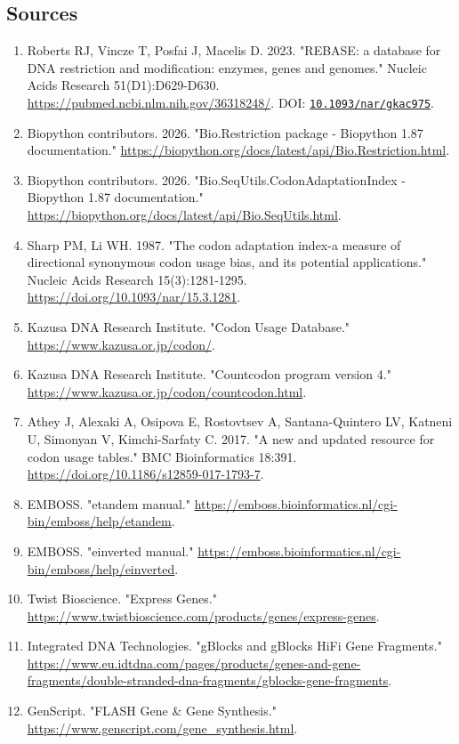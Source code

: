 \documentclass[11pt]{report}
\begin{document}
\subsection{Sources}
\begin{enumerate}
\item Roberts RJ, Vincze T, Posfai J, Macelis D. 2023. "REBASE: a database for DNA restriction and modification: enzymes, genes and genomes." Nucleic Acids Research 51(D1):D629-D630. \url{https://pubmed.ncbi.nlm.nih.gov/36318248/}. DOI: \href{https://doi.org/10.1093/nar/gkac975}{\nolinkurl{10.1093/nar/gkac975}}.
\item Biopython contributors. 2026. "Bio.Restriction package - Biopython 1.87 documentation." \url{https://biopython.org/docs/latest/api/Bio.Restriction.html}.
\item Biopython contributors. 2026. "Bio.SeqUtils.CodonAdaptationIndex - Biopython 1.87 documentation." \url{https://biopython.org/docs/latest/api/Bio.SeqUtils.html}.
\item Sharp PM, Li WH. 1987. "The codon adaptation index-a measure of directional synonymous codon usage bias, and its potential applications." Nucleic Acids Research 15(3):1281-1295. \url{https://doi.org/10.1093/nar/15.3.1281}.
\item Kazusa DNA Research Institute. "Codon Usage Database." \url{https://www.kazusa.or.jp/codon/}.
\item Kazusa DNA Research Institute. "Countcodon program version 4." \url{https://www.kazusa.or.jp/codon/countcodon.html}.
\item Athey J, Alexaki A, Osipova E, Rostovtsev A, Santana-Quintero LV, Katneni U, Simonyan V, Kimchi-Sarfaty C. 2017. "A new and updated resource for codon usage tables." BMC Bioinformatics 18:391. \url{https://doi.org/10.1186/s12859-017-1793-7}.
\item EMBOSS. "etandem manual." \url{https://emboss.bioinformatics.nl/cgi-bin/emboss/help/etandem}.
\item EMBOSS. "einverted manual." \url{https://emboss.bioinformatics.nl/cgi-bin/emboss/help/einverted}.
\item Twist Bioscience. "Express Genes." \url{https://www.twistbioscience.com/products/genes/express-genes}.
\item Integrated DNA Technologies. "gBlocks and gBlocks HiFi Gene Fragments." \url{https://www.eu.idtdna.com/pages/products/genes-and-gene-fragments/double-stranded-dna-fragments/gblocks-gene-fragments}.
\item GenScript. "FLASH Gene \& Gene Synthesis." \url{https://www.genscript.com/gene_synthesis.html}.

\end{enumerate}
\end{document}
